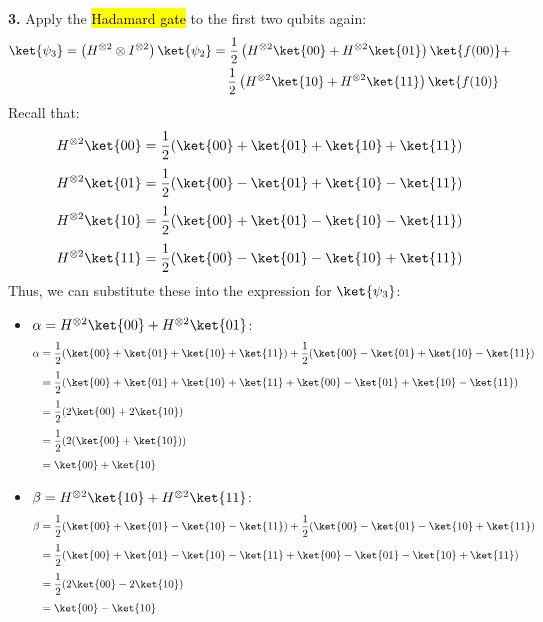 \highspace
\textbf{3.} Apply the \hl{Hadamard gate} to the first two qubits again:
\begin{gather*}
    \ket{\psi_3} = \left(H^{\otimes 2} \otimes I^{\otimes 2}\right)\ket{\psi_2} = \frac{1}{2}\left(
        H^{\otimes 2}\ket{00} + H^{\otimes 2}\ket{01}
    \right) \ket{f(00)} + \\
    \phantom{\ket{\psi_3} = \left(H^{\otimes 2} \otimes I^{\otimes 2}\right)\ket{\psi_2}} \; \frac{1}{2}\left(
        H^{\otimes 2}\ket{10} + H^{\otimes 2}\ket{11}
    \right) \ket{f(10)}
\end{gather*}
Recall that:
\begin{align*}
    H^{\otimes 2}\ket{00} &= \frac{1}{2}(\ket{00} + \ket{01} + \ket{10} + \ket{11}) \\[.3em]
    H^{\otimes 2}\ket{01} &= \frac{1}{2}(\ket{00} - \ket{01} + \ket{10} - \ket{11}) \\[.3em]
    H^{\otimes 2}\ket{10} &= \frac{1}{2}(\ket{00} + \ket{01} - \ket{10} - \ket{11}) \\[.3em]
    H^{\otimes 2}\ket{11} &= \frac{1}{2}(\ket{00} - \ket{01} - \ket{10} + \ket{11})
\end{align*}
Thus, we can substitute these into the expression for $\ket{\psi_3}$:
\begin{itemize}
    \item $\alpha = H^{\otimes 2}\ket{00} + H^{\otimes 2}\ket{01}$:
        \begin{align*}
            \alpha &= \frac{1}{2}(\ket{00} + \ket{01} + \ket{10} + \ket{11}) + \frac{1}{2}(\ket{00} - \ket{01} + \ket{10} - \ket{11}) \\[.3em]
            &= \frac{1}{2}(\ket{00} + \ket{01} + \ket{10} + \ket{11} + \ket{00} - \ket{01} + \ket{10} - \ket{11}) \\[.3em]
            &= \frac{1}{2}(2\ket{00} + 2\ket{10}) \\[.3em]
            &= \frac{1}{2}(2(\ket{00} + \ket{10})) \\[.3em]
            &= \ket{00} + \ket{10}
        \end{align*}
    \item $\beta = H^{\otimes 2}\ket{10} + H^{\otimes 2}\ket{11}$:
        \begin{align*}
            \beta &= \frac{1}{2}(\ket{00} + \ket{01} - \ket{10} - \ket{11}) + \frac{1}{2}(\ket{00} - \ket{01} - \ket{10} + \ket{11}) \\[.3em]
            &= \frac{1}{2}(\ket{00} + \ket{01} - \ket{10} - \ket{11} + \ket{00} - \ket{01} - \ket{10} + \ket{11}) \\[.3em]
            &= \frac{1}{2}(2\ket{00} - 2\ket{10}) \\[.3em]
            &= \ket{00} - \ket{10}
        \end{align*}
\end{itemize}

